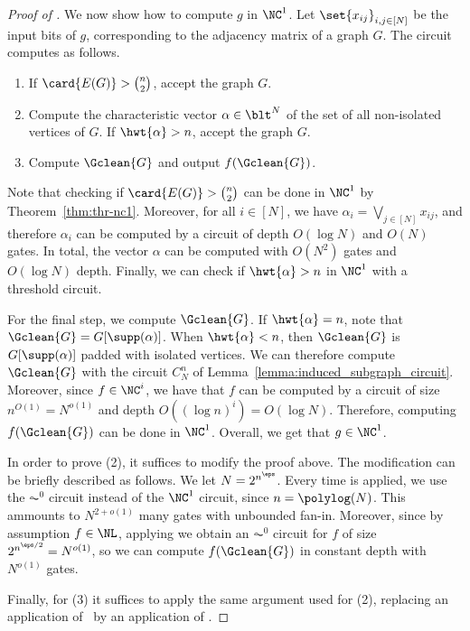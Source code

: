 \documentclass[11pt]{article}
\begin{document}
\begin{proof}[Proof of ]
    We now show how to compute $g$ in $\NC^1$.
    Let $\set{x_{ij}}_{i,j \in [N]}$ be the input bits of $g$,
    corresponding to the adjacency matrix of a graph $G$.
    The circuit computes as follows.

    \begin{enumerate}
        \item If $\card{E(G)} > \binom{n}{2}$, accept the graph $G$.
        \item Compute the characteristic vector $\alpha \in \blt^N$
            of the set of all non-isolated vertices of $G$.
            If $\hwt{\alpha} > n$, accept the graph $G$.
        \item Compute $\Gclean{G}$ and output $f(\Gclean{G})$.
    \end{enumerate}


    Note that checking if
    $\card{E(G)} > \binom{n}{2}$
    can be done 
    in $\NC^1$ by Theorem~\ref{thm:thr-nc1}.
    Moreover,
    for all $i \in [N]$,
    we have $\alpha_i = \bigvee_{j \in [N]} x_{ij}$,
    and therefore $\alpha_i$ can be computed by a circuit of depth $O(\log N)$ 
    and $O(N)$ gates.
    In total, 
    the vector $\alpha$ can be computed
     with $O(N^2)$ gates and $O(\log N)$ depth.
    Finally, we can check if
    $\hwt{\alpha} > n$
    in $\NC^1$ with a threshold circuit.

    For the final step, we compute $\Gclean{G}$.
    If $\hwt{\alpha} = n$,
    note that $\Gclean{G} = G[\supp(\alpha)]$.
    When $\hwt{\alpha} < n$,
    then $\Gclean{G}$ is $G[\supp(\alpha)]$ padded with isolated vertices.
    We can therefore compute $\Gclean{G}$
    with the circuit 
    $C_N^n$
    of Lemma~\ref{lemma:induced_subgraph_circuit}.
    Moreover, since $f \in \NC^i$,
    we have that $f$ can be computed by a circuit of size
    $n^{O(1)} = N^{o(1)}$
    and depth
    $O((\log n)^i) = O(\log N)$.
    Therefore, computing $f(\Gclean{G})$ can be done in $\NC^1$. Overall, we get that $g \in \NC^1$.

    In order to prove (2), it suffices to modify the proof above.
    The modification can be briefly described as follows.
    We let $N = 2^{n^\eps}$.
    Every time  is applied,
    we use the $\AC^0$ circuit instead of the $\NC^1$ circuit,
    since $n = \polylog(N)$. This ammounts to $N^{2+o(1)}$ many gates with
    unbounded fan-in.
    Moreover, since by assumption 
    $f \in \NL$,
    applying  we obtain 
    an
    $\AC^0$ circuit for
    $f$ of size
    $2^{n^{\eps/2}} = N^{o(1)}$,
    so we can compute $f(\Gclean{G})$ in constant depth
    with $N^{o(1)}$ gates.

    Finally, for (3) it suffices to apply the same argument used for (2),
    replacing an application of~
    by an application of .
\end{proof}
\end{document}
